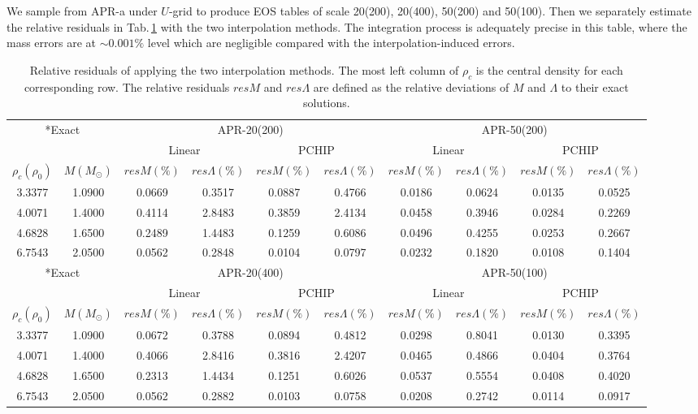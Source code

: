 \documentclass[preprint,tightenlines,eqsecnum,floats,aps,amsmath,amssymb,nofootinbib,prd,showpacs]{revtex4}
\begin{document}
We sample from APR-a under $U$-grid to produce EOS tables of scale 20(200), 20(400), 50(200) and 50(100). Then we separately estimate the relative residuals in Tab.$\,$\ref{Umesh} with the two interpolation methods. The integration process is adequately precise in this table, where the mass errors are at $\sim0.001\%$ level which are negligible compared with the interpolation-induced errors.

\begin{table}[!htbp]
\centering
\begin{tabular}{|c|c|c|c|c|c|c|c|c|c|}
\hline
\multicolumn{2}{|c|}{ \multirow{2}*{Exact} } & \multicolumn{4}{c|}{APR-20(200)} & \multicolumn{4}{c|}{APR-50(200)}\\
\cline{3-10}
\multicolumn{2}{|c|}{} & \multicolumn{2}{c|}{Linear} & \multicolumn{2}{c|}{PCHIP} & \multicolumn{2}{c|}{Linear} & \multicolumn{2}{c|}{PCHIP}\\
\hline
 $\rho_c(\rho_0)$ & $M(M_{\odot})$ & $resM(\%)$ & $res\Lambda(\%)$ & $resM(\%)$ & $res\Lambda(\%)$ & $resM(\%)$ & $res\Lambda(\%)$ & $resM(\%)$ & $res\Lambda(\%)$\\
\hline
3.3377&1.0900 	&0.0669	&0.3517	&0.0887	&0.4766	&0.0186	&0.0624	&0.0135	&0.0525\\
4.0071&1.4000	&0.4114	&2.8483	&0.3859	&2.4134	&0.0458	&0.3946	&0.0284	&0.2269\\
4.6828&1.6500 	&0.2489	&1.4483	&0.1259	&0.6086	&0.0496	&0.4255	&0.0253	&0.2667\\
6.7543&2.0500 	&0.0562	&0.2848	&0.0104	&0.0797	&0.0232	&0.1820	&0.0108	&0.1404\\

\hline
\multicolumn{2}{|c|}{ \multirow{2}*{Exact} } & \multicolumn{4}{c|}{APR-20(400)} & \multicolumn{4}{c|}{APR-50(100)}\\
\cline{3-10}
\multicolumn{2}{|c|}{} & \multicolumn{2}{c|}{Linear} & \multicolumn{2}{c|}{PCHIP} & \multicolumn{2}{c|}{Linear} & \multicolumn{2}{c|}{PCHIP}\\
\hline
 $\rho_c(\rho_0)$ & $M(M_{\odot})$ & $resM(\%)$ & $res\Lambda(\%)$ & $resM(\%)$ & $res\Lambda(\%)$ & $resM(\%)$ & $res\Lambda(\%)$ & $resM(\%)$ & $res\Lambda(\%)$\\
\hline
3.3377&1.0900 	&0.0672	&0.3788	&0.0894	&0.4812	&0.0298	&0.8041	&0.0130	&0.3395\\
4.0071&1.4000	&0.4066	&2.8416	&0.3816	&2.4207	&0.0465	&0.4866	&0.0404	&0.3764\\
4.6828&1.6500 	&0.2313	&1.4434	&0.1251	&0.6026	&0.0537	&0.5554	&0.0408	&0.4020\\
6.7543&2.0500 	&0.0562	&0.2882	&0.0103	&0.0758	&0.0208	&0.2742	&0.0114	&0.0917\\

\hline
\end{tabular}
\caption{Relative residuals of applying the two interpolation methods. The most left column of $\rho_c$ is the central density for each corresponding row. The relative residuals $resM$ and $res\Lambda$ are defined as the relative deviations of $M$ and $\Lambda$ to their exact solutions.}\label{Umesh}
\end{table}
\end{document}
